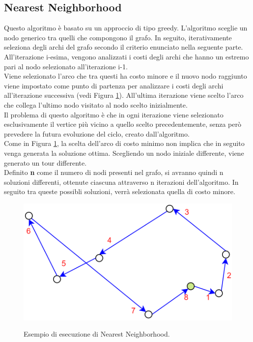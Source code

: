 \subsection{Nearest Neighborhood}
Questo algoritmo è basato su un approccio di tipo greedy.
L'algoritmo sceglie un nodo generico tra quelli che compongono il grafo. In seguito, iterativamente seleziona degli archi del grafo secondo il criterio enunciato nella seguente parte.\\
All'iterazione i-esima, vengono analizzati i costi degli archi che hanno un estremo pari al nodo selezionato all'iterazione i-1.\\
Viene selezionato l'arco che tra questi ha costo minore e il nuovo nodo raggiunto viene impostato come punto di partenza per analizzare i costi degli archi all'iterazione successiva (vedi Figura \ref{nearest_neighborhood}). All'ultima iterazione viene scelto l'arco che collega l'ultimo nodo visitato al nodo scelto inizialmente.\\
Il problema di questo algoritmo è che in ogni iterazione viene selezionato esclusivamente il vertice più vicino a quello scelto precedentemente, senza però prevedere la futura evoluzione del ciclo, creato dall'algoritmo.\\
Come in Figura \ref{nearest_neighborhood}, la scelta dell'arco di costo minimo non implica che in seguito venga generata la soluzione ottima. Scegliendo un nodo iniziale differente, viene generato un tour differente.\\
Definito \textbf{n} come il numero di nodi presenti nel grafo, si avranno quindi n soluzioni differenti, ottenute ciascuna attraverso n iterazioni dell'algoritmo. In seguito tra queste possibli soluzioni, verrà selezionata quella di costo minore.\\
\begin{figure}[H] 
\begin{center} 
  \includegraphics[scale=0.4]{Images/nearest_neighborhood}\\ 
  \caption{\footnotesize{Esempio di esecuzione di Nearest Neighborhood.}}
  \label{nearest_neighborhood} 
\end{center} 
\end{figure}

